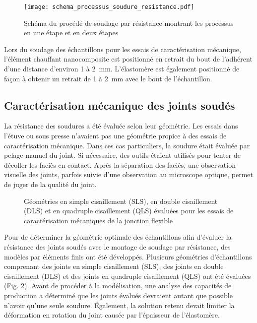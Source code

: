 \begin{figure}[h]
	\centering
	\texttt{[image: schema\_processus\_soudure\_resistance.pdf]}
	\caption{Schéma du procédé de soudage par résistance montrant les processus en une étape et en deux étapes}
	\label{fig:schema_processus_soudure_resistance}
\end{figure}

Lors du soudage des échantillons pour les essais de caractérisation mécanique, l'élément chauffant nanocomposite est positionné en retrait du bout de l'adhérent d'une distance d'environ 1 à \SI{2}{\milli\metre}. 
L'élastomère est également positionné de façon à obtenir un retrait de 1 à \SI{2}{\milli\metre} avec le bout de l'échantillon. 

\subsection{Caractérisation mécanique des joints soudés}

La résistance des soudures a été évaluée selon leur géométrie. 
Les essais dans l'étuve ou sous presse n'avaient pas une géométrie propice à des essais de caractérisation mécanique. 
Dans ces cas particuliers, la soudure était évaluée par pelage manuel du joint. 
Si nécessaire, des outils étaient utilisés pour tenter de décoller les faciès en contact. 
Après la séparation des faciès, une observation visuelle des joints, parfois suivie d'une observation au microscope optique, permet de juger de la qualité du joint. 

\begin{figure}[h]
	\centering
	
	\caption{Géométries en simple cisaillement (SLS), en double cisaillement (DLS) et en quadruple cisaillement (QLS) évaluées pour les essais de caractérisation mécaniques de la jonction flexible}
	\label{fig:geometrie_echantillons}
\end{figure}


Pour de déterminer la géométrie optimale des échantillons afin d'évaluer la résistance des joints soudés avec le montage de soudage par résistance, des modèles par éléments finis ont été développés. 
Plusieurs géométries d'échantillons comprenant des joints en simple cisaillement (SLS), des joints en double cisaillement (DLS) et des joints en quadruple cisaillement (QLS) ont été évaluées (Fig. \ref{fig:geometrie_echantillons}). 
Avant de procéder à la modélisation, une analyse des capacités de production a déterminé que les joints évalués devraient autant que possible n'avoir qu'une seule soudure. 
Également, la solution retenu devait limiter la déformation en rotation du joint causée par l'épaisseur de l'élastomère. 


